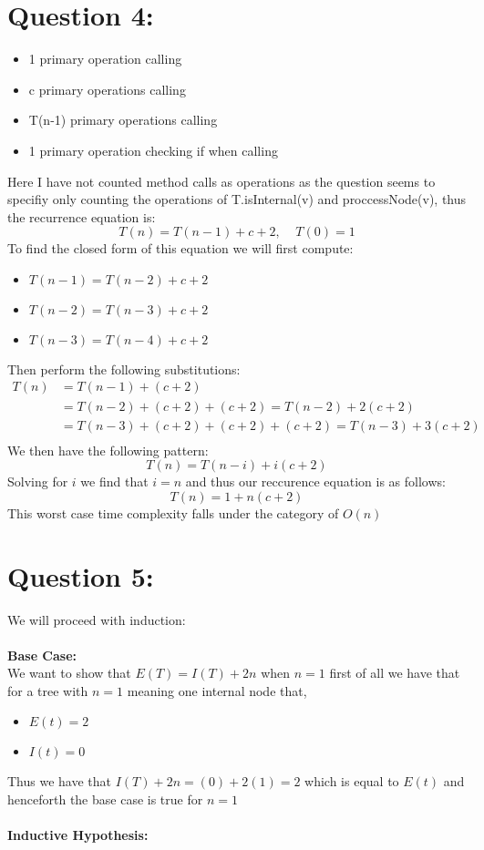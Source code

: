 \documentclass{article}
\begin{document}
\newpage
\section*{Question 4:}
\begin{itemize}
    \item 1 primary operation calling 
    \item c primary operations calling 
    \item T(n-1) primary operations calling 
    \item 1 primary operation checking if  when calling 
\end{itemize}
Here I have not counted method calls as operations as the question seems to specifiy only counting the operations of T.isInternal(v) and proccessNode(v), thus the recurrence equation is:
$$T(n) = T(n-1)+c+2,\;\;\;\;T(0)=1$$
To find the closed form of this equation we will first compute:
\begin{itemize}
    \item $T(n-1)=T(n-2) + c + 2$
    \item $T(n-2)=T(n-3) + c + 2$
    \item $T(n-3)=T(n-4) + c + 2$
\end{itemize}
Then perform the following substitutions:
$$\begin{aligned}
    T(n)&=T(n-1)+(c+2)\\
    &=T(n-2)+(c+2)+(c+2)=T(n-2)+2(c+2)\\
    &=T(n-3)+(c+2)+(c+2)+(c+2)=T(n-3)+3(c+2)\\
\end{aligned}$$
We then have the following pattern: $$T(n)=T(n-i)+i(c+2)$$
Solving for $i$ we find that $i=n$ and thus our reccurence equation is as follows:$$T(n)=1+n(c+2)$$
This worst case time complexity falls under the category of $O(n)$

\newpage
\section*{Question 5:}
We will proceed with induction:\\\\
\textbf{Base Case:\\}
We want to show that $E(T)=I(T)+2n$ when $n=1$ first of all we have that for a tree with $n=1$ meaning one internal node that,
\begin{itemize}
    \item $E(t)=2$
    \item $I(t)=0$
\end{itemize}
Thus we have that $I(T)+2n=(0)+2(1)=2$ which is equal to $E(t)$ and henceforth the base case is true for $n=1$\\\\
\textbf{Inductive Hypothesis:}
\end{document}
